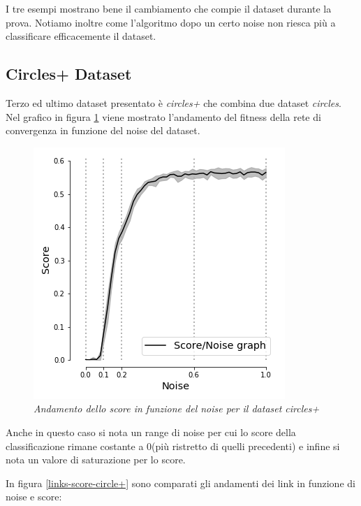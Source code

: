 \documentclass[12pt,a4paper]{report}
\begin{document}
I tre esempi mostrano bene il cambiamento che compie il dataset durante la prova.
Notiamo inoltre come l'algoritmo dopo un certo noise non riesca più a classificare efficacemente il dataset.

\subsection{Circles+ Dataset}

Terzo ed ultimo dataset presentato è \textit{circles+} che combina due dataset \textit{circles}.
Nel grafico in figura \ref{score-circles+} viene mostrato l'andamento del fitness della rete di convergenza in funzione del noise del dataset.

\begin{figure}[H]
 \centering
 \includegraphics[scale = 0.6]{images/score_noise_circles+}
 \caption{\textit{Andamento dello score in funzione del noise per il dataset circles+}}
 \label{score-circles+}
\end{figure}

Anche in questo caso si nota un range di noise per cui lo score della classificazione rimane costante a 0(più ristretto di quelli precedenti) e infine si nota un valore di saturazione per lo score.

In figura \ref{links-score-circle+} sono comparati gli andamenti dei link in funzione di noise e score:
\end{document}
